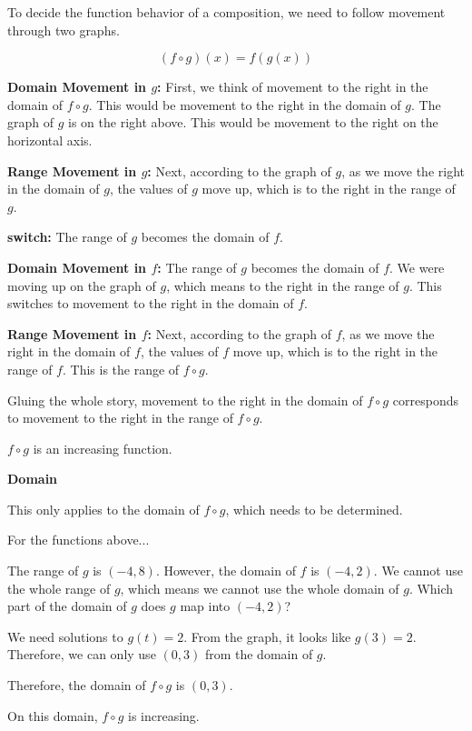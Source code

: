 \documentclass{ximera}
\begin{document}
To decide the function behavior of a composition, we need to follow movement through two graphs. 



\[
(f \circ g)(x) = f(g(x))
\]



\textbf{\textcolor{blue!55!black}{Domain Movement in $g$:}}  First, we think of movement to the right in the domain of $f \circ g$.  This would be movement to the right in the domain of $g$.  The graph of $g$ is on the right above.  This would be movement to the right on the horizontal axis.



\textbf{\textcolor{blue!55!black}{Range Movement in $g$:}}  Next, according to the graph of $g$, as we move the right in the domain of $g$, the values of $g$ move up, which is to the right in the range of $g$.




\textbf{\textcolor{blue!55!black}{switch:}}   The range of $g$ becomes the domain of $f$.  


\textbf{\textcolor{blue!55!black}{Domain Movement in $f$:}}   The range of $g$ becomes the domain of $f$.  We were moving up on the graph of $g$, which means to the right in the range of $g$.  This switches to movement to the right in the domain of $f$.


\textbf{\textcolor{blue!55!black}{Range Movement in $f$:}}  Next, according to the graph of $f$, as we move the right in the domain of $f$, the values of $f$ move up, which is to the right in the range of $f$.  This is the range of $f \circ g$.




Gluing the whole story, movement to the right in the domain of $f \circ g$ corresponds to movement to the right in the range of $f \circ g$.

$f \circ g$ is an increasing function.



\begin{observation} \textbf{\textcolor{-red!75}{Domain}}


This only applies to the domain of $f \circ g$, which needs to be determined. 

For the functions above...

The range of $g$ is $(-4, 8)$.  However, the domain of $f$ is $(-4, 2)$.   We cannot use the whole range of $g$, which means we cannot use the whole domain of $g$.  Which part of the domain of $g$ does $g$ map into $(-4, 2)$? 


We need solutions to $g(t) = 2$.  From the graph, it looks like $g(3) = 2$.  Therefore, we can only use $(0, 3)$ from the domain of $g$.


Therefore, the domain of $f \circ g$ is $(0, 3)$.  

On this domain, $f \circ g$ is increasing.



\end{observation}
\end{document}
